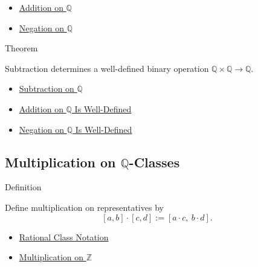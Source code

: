 \begin{dependencies}
\begin{itemize}
  \item \hyperref[def:addition-on-q-classes]{Addition on $\mathbb{Q}$}
  \item \hyperref[def:negation-on-q-classes]{Negation on $\mathbb{Q}$}
\end{itemize}
\end{dependencies}

\begin{theorembox}{Theorem}
\begin{theorem}
\label{thm:subtraction-on-q-well-defined}
Subtraction determines a well-defined binary operation
$\mathbb{Q}\times\mathbb{Q}\to\mathbb{Q}$.
\end{theorem}
\end{theorembox}

\begin{dependencies}
\begin{itemize}
  \item \hyperref[def:subtraction-on-q]{Subtraction on $\mathbb{Q}$}
  \item \hyperref[thm:addition-on-q-well-defined]{Addition on $\mathbb{Q}$ Is Well-Defined}
  \item \hyperref[thm:negation-on-q-well-defined]{Negation on $\mathbb{Q}$ Is Well-Defined}
\end{itemize}
\end{dependencies}

\subsection*{\texorpdfstring{Multiplication on $\mathbb{Q}$-Classes}{Multiplication on Q-Classes}}

\begin{definitionbox}{Definition}
\begin{definition}
\label{def:multiplication-on-q-classes}
Define multiplication on representatives by
\[
[a,b]\cdot[c,d]:=[a\cdot c,\ b\cdot d].
\]
\end{definition}
\end{definitionbox}

\begin{dependencies}
\begin{itemize}
  \item \hyperref[def:rational-class-notation]{Rational Class Notation}
  \item \hyperref[def:multiplication-on-z-classes]{Multiplication on $\mathbb{Z}$}
\end{itemize}
\end{dependencies}

